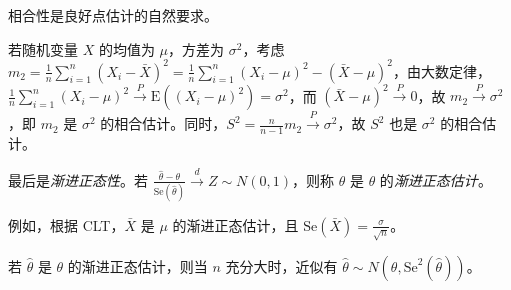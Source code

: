 \documentclass[../main.tex]{subfiles}
\begin{document}
相合性是良好点估计的自然要求。

\begin{example}
    若随机变量 $X$ 的均值为 $\mu$，方差为 $\sigma^2$，考虑 $m_2=\frac1n\sum_{i=1}^n(X_i-\bar X)^2=\frac1n\sum_{i=1}^n(X_i-\mu)^2-(\bar X-\mu)^2$，由大数定律，$\frac1n\sum_{i=1}^n(X_i-\mu)^2\overset{P}{\rightarrow}\mathrm E((X_i-\mu)^2)=\sigma^2$，而 $(\bar X-\mu)^2\overset{P}{\rightarrow}0$，故 $m_2\overset{P}{\rightarrow}\sigma^2$，即 $m_2$ 是 $\sigma^2$ 的相合估计。同时，$S^2=\frac n{n-1}m_2\overset{P}{\rightarrow}\sigma^2$，故 $S^2$ 也是 $\sigma^2$ 的相合估计。
\end{example}

最后是\emph{渐进正态性}。若 $\frac{\hat\theta-\theta}{\mathrm{Se}(\hat\theta)}\overset{d}{\rightarrow}Z\sim N(0,1)$，则称 $\hat\theta$ 是 $\theta$ 的\emph{渐进正态估计}。

例如，根据 CLT，$\bar X$ 是 $\mu$ 的渐进正态估计，且 $\mathrm{Se}(\bar X)=\frac{\sigma}{\sqrt n}$。

若 $\hat\theta$ 是 $\theta$ 的渐进正态估计，则当 $n$ 充分大时，近似有 $\hat\theta\sim N(\theta,\mathrm{Se}^2(\hat\theta))$。
\end{document}
